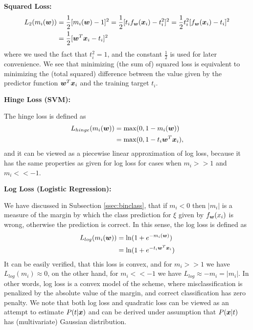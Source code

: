 {\bf Squared Loss:}
\begin{align}
L_2(m_i(\boldsymbol{w})) &= \frac{1}{2}[m_i(\boldsymbol{w}) - 1]^2 = \frac{1}{2}[t_i f_{\boldsymbol{w}}(\boldsymbol{x}_i) - t_i^2]^2 = \frac{1}{2}t_i^2 [f_{\boldsymbol{w}}(\boldsymbol{x}_i) - t_i]^2 \nonumber \\
& = \frac{1}{2}[\boldsymbol{w}^T\boldsymbol{x}_i - t_i]^2 \label{eq:loss2}
\end{align}
where we used the fact that $t_i^2 = 1$, and the constant
$\frac{1}{2}$ is used for later convenience. We see that minimizing
(the sum of) squared loss is equivalent to minimizing the (total
squared) difference between the value given by the predictor function
$\boldsymbol{w}^T\boldsymbol{x}_i$ and the training target $t_i$.

{\bf Hinge Loss (SVM):}

The hinge loss is defined as
\[ \begin{split}
L_{hinge}(m_i(\boldsymbol{w})) &= \max(0, 1 - m_i(\boldsymbol{w})) \\
&= \max(0, 1 - t_i \boldsymbol{w}^T \boldsymbol{x}_i),
\end{split} \] 
and it can be viewed as a piecewise linear approximation of log loss,
because it has the same properties as given for log loss for cases
when $m_i >> 1$ and $m_i << -1$.

{\bf Log Loss (Logistic Regression):}

We have discussed in Subsection \ref{ssec:binclass}, that if $m_i < 0$
then $|m_i|$ is a measure of the margin by which the class prediction
for $\xi$ given by $f_{\boldsymbol{w}}(x_i)$ is wrong, otherwise the prediction is
correct. In this sense, the log loss is defined as
\[ \begin{split}
L_{log}(m_i(\boldsymbol{w})) &= \ln (1 + e^{-m_i(\boldsymbol{w})}) \\
 &= \ln (1 + e^{-t_i\boldsymbol{w}^T\boldsymbol{x}_i}) 
\end{split} \] 
It can be easily verified, that this loss is convex, and for $m_i >>
1$ we have $L_{log}(m_i) \approx 0$, on the other hand, for $m_i <<
-1$ we have $L_{log} \approx -m_i = |m_i|$. In other words, log loss
is a convex model of the scheme, where misclassification is penalized
by the absolute value of the margin, and correct classification has
zero penalty. We note that both log loss and quadratic loss can be
viewed as an attempt to estimate $P(t|\boldsymbol{x})$ and can be derived under
assumption that $P(\boldsymbol{x}|t)$ has (multivariate) Gaussian distribution.

\ENDCOMMENT


